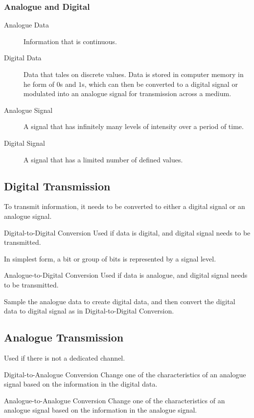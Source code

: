 \documentclass[\main/notes.tex]{subfiles}
\begin{document}
				\subsubsection{Analogue and Digital}
					\begin{indentparagraph}
						\begin{description}
							\item[Analogue Data] Information that is continuous.
							\item[Digital Data] Data that tales on discrete values. Data is stored in computer memory in he form of $0$s and $1$s, which can then be converted to a digital signal or modulated into an analogue signal for transmission across a medium.
							\item[Analogue Signal] A signal that has infinitely many levels of intensity over a period of time.
							\item[Digital Signal] A signal that has a limited number of defined values. 
						\end{description}
					\end{indentparagraph}
			\pagebreak
			\subsection{Digital Transmission}
				To transmit information, it needs to be converted to either a digital signal or an analogue signal.
				\begin{definition}{Digital-to-Digital Conversion}
					Used if data is digital, and digital signal needs to be transmitted.

					In simplest form, a bit or group of bits is represented by a signal level.
				\end{definition}
				\begin{definition}{Analogue-to-Digital Conversion}
					Used if data is analogue, and digital signal needs to be transmitted.

					Sample the analogue data to create digital data, and then convert the digital data to digital signal as in Digital-to-Digital Conversion.
				\end{definition}
			\subsection{Analogue Transmission}
				Used if there is not a dedicated channel.
				\begin{definition}{Digital-to-Analogue Conversion}
					Change one of the characteristics of an analogue signal based on the information in the digital data.
				\end{definition}
				\begin{definition}{Analogue-to-Analogue Conversion}
					Change one of the characteristics of an analogue signal based on the information in the analogue signal.
				\end{definition}
		\pagebreak
\end{document}
